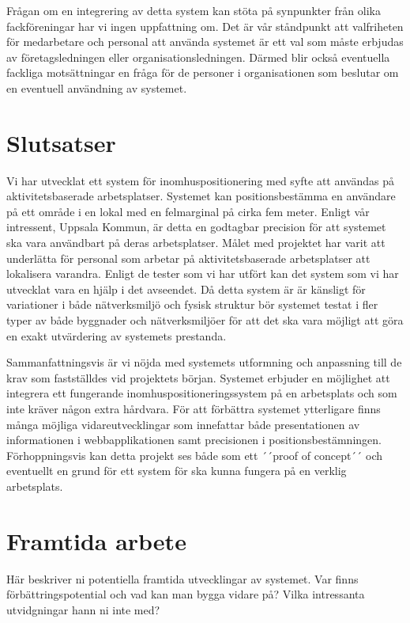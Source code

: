 \documentclass[a4paper,12pt]{article}
\begin{document}
Frågan om en integrering av detta system kan stöta på synpunkter från olika \\fackföreningar har vi ingen uppfattning om. Det är vår ståndpunkt att valfriheten för medarbetare och personal att använda systemet är ett val som måste erbjudas av företagsledningen eller organisationsledningen. Därmed blir också eventuella fackliga motsättningar en fråga för de personer i organisationen som beslutar om en eventuell användning av systemet.



\section{Slutsatser}

Vi har utvecklat ett system för inomhuspositionering med syfte att användas på aktivitetsbaserade arbetsplatser. Systemet kan positionsbestämma en användare på ett område i en lokal med en felmarginal på cirka fem meter. Enligt vår intressent, Uppsala Kommun, är detta en godtagbar precision för att systemet ska vara användbart på deras arbetsplatser. Målet med projektet har varit att underlätta för personal som arbetar på aktivitetsbaserade arbetsplatser att lokalisera varandra. Enligt de tester som vi har utfört kan det system som vi har utvecklat vara en hjälp i det avseendet.
Då detta system är är känsligt för variationer i både nätverksmiljö och fysisk struktur bör systemet testat i fler typer av både byggnader och nätverksmiljöer för att det ska vara möjligt att göra en exakt utvärdering av systemets prestanda.

Sammanfattningsvis är vi nöjda med systemets utformning och anpassning till de krav som fastställdes vid projektets början. Systemet erbjuder en möjlighet att integrera ett fungerande inomhuspositioneringssystem på en arbetsplats och som inte kräver någon extra hårdvara. För att förbättra systemet ytterligare finns många möjliga vidareutvecklingar som innefattar både presentationen av informationen i webbapplikationen samt precisionen i positionsbestämningen. Förhoppningsvis kan detta projekt ses både som ett ´´proof of concept´´ och eventuellt en grund för ett system för ska kunna fungera på en verklig arbetsplats.

\section{Framtida arbete}
\iffalse
Här beskriver ni potentiella framtida utvecklingar av systemet. Var finns förbättrings\-poten\-tial och vad kan man bygga vidare på? Vilka intressanta utvidgningar hann ni inte med?
\end{document}
